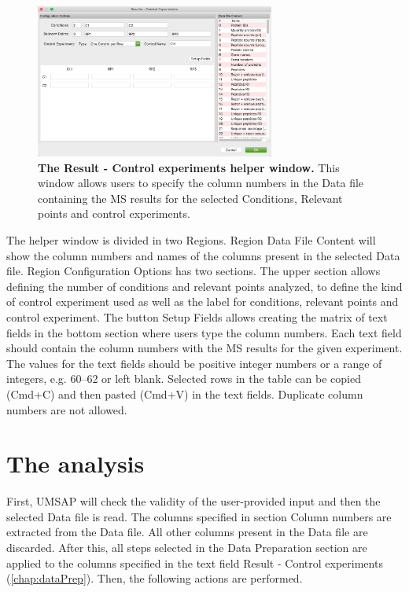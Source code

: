 \begin{figure}[h]
    \centering
    \includegraphics[width=0.7\textwidth]{./IMAGES/MOD-PROTPROF/protprof-rescontrol.jpg}
    \caption[The Result - Control experiments helper window]{\textbf{The Result -
    Control experiments helper window.} This window allows users to specify the column
    numbers in the Data file containing the MS results for the selected Conditions,
    Relevant points and control experiments.} 
    \label{fig:protprofResControlWindow}
    \vspace{-5pt}
\end{figure}

The helper window is divided in two Regions. Region Data File Content will show the 
column numbers and names of the columns present in the selected Data file. Region
Configuration Options has two sections. The upper section allows defining the number
of conditions and relevant points analyzed, to define the kind of control experiment
used as well as the label for conditions, relevant points and control experiment.
The button Setup Fields allows creating the matrix of text fields in the bottom section
where users type the column numbers. Each text field should contain the column
numbers with the MS results for the given experiment. The values for the text fields
should be positive integer numbers or a range of integers, e.g. 
\numrange[range-phrase=--]{60}{62} or left blank. Selected rows in the table can
be copied (Cmd+C) and then pasted (Cmd+V) in the text fields. Duplicate column numbers
are not allowed. 

\section{The analysis}
\label{sec:protprofTTest}

First, UMSAP will check the validity of the user-provided input and then the selected
Data file is read. The columns specified in section Column numbers are extracted
from the Data file. All other columns present in the Data file are discarded. After
this, all steps selected in the Data Preparation section are applied to the columns
specified in the text field Result - Control experiments (\autoref{chap:dataPrep}).
Then, the following actions are performed.

